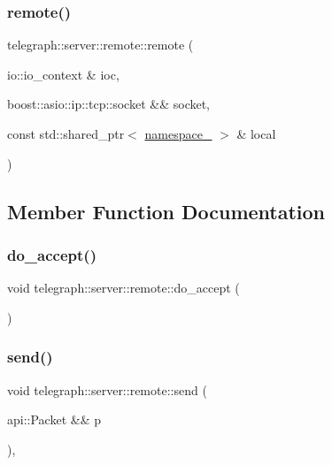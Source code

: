 \subsubsection{\texorpdfstring{remote()}{remote()}}
{\footnotesize\ttfamily telegraph\+::server\+::remote\+::remote (\begin{DoxyParamCaption}\item[{io\+::io\+\_\+context \&}]{ioc,  }\item[{boost\+::asio\+::ip\+::tcp\+::socket \&\&}]{socket,  }\item[{const std\+::shared\+\_\+ptr$<$ \hyperlink{classtelegraph_1_1namespace__}{namespace\+\_\+} $>$ \&}]{local }\end{DoxyParamCaption})}



\subsection{Member Function Documentation}
\mbox{\label{classtelegraph_1_1server_1_1remote_a10d60a8be9442784f3f1d63492835841}} 
\subsubsection{\texorpdfstring{do\+\_\+accept()}{do\_accept()}}
{\footnotesize\ttfamily void telegraph\+::server\+::remote\+::do\+\_\+accept (\begin{DoxyParamCaption}{ }\end{DoxyParamCaption})}

\mbox{\label{classtelegraph_1_1server_1_1remote_aa6a2f2d4045ea8bb51938ca3da4e1b5e}} 
\subsubsection{\texorpdfstring{send()}{send()}}
{\footnotesize\ttfamily void telegraph\+::server\+::remote\+::send (\begin{DoxyParamCaption}\item[{api\+::\+Packet \&\&}]{p }\end{DoxyParamCaption})\hspace{0.3cm}{\ttfamily [override]}, {\ttfamily [virtual]}}



